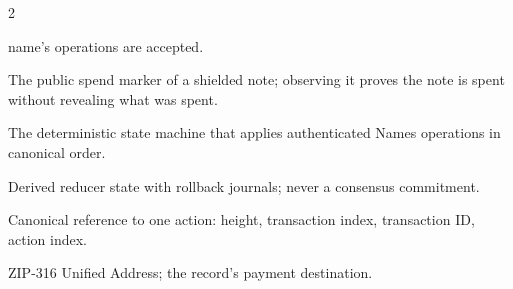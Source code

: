 \documentclass[11pt]{article}
\begin{document}
\begin{multicols}{2}
\begin{description}
name's operations are accepted.
\item[Nullifier] The public spend marker of a shielded note; observing it
proves the note is spent without revealing what was spent.
\item[Reducer] The deterministic state machine that applies authenticated
Names operations in canonical order.
\item[Snapshot] Derived reducer state with rollback journals; never a
consensus commitment.
\item[\textsf{StateRef}] Canonical reference to one action: height,
transaction index, transaction ID, action index.
\item[UA] ZIP-316 Unified Address; the record's payment destination.
\end{description}
\end{multicols}
\end{document}
